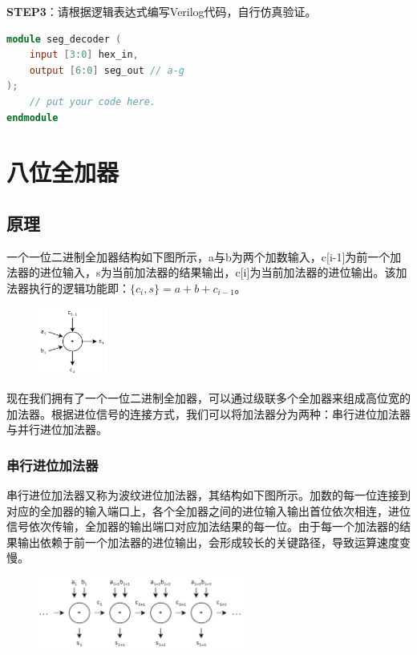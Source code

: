 \documentclass{ctexart}
\begin{document}
\textbf{STEP3}：请根据逻辑表达式编写Verilog代码，自行仿真验证。
\begin{lstlisting}[language=Verilog]
module seg_decoder (
    input [3:0] hex_in,
    output [6:0] seg_out // a-g
);
    // put your code here.
endmodule
\end{lstlisting}


\section{八位全加器}

\subsection{原理}

一个一位二进制全加器结构如下图所示，a与b为两个加数输入，c[i-1]为前一个加法器的进位输入，s为当前加法器的结果输出，c[i]为当前加法器的进位输出。该加法器执行的逻辑功能即：$\{c_i,s\}=a+b+c_{i-1}$。

\begin{figure}[H]
    \centering
    \includegraphics[width=0.2\textwidth]{lab1/3.jpg}
\end{figure}

现在我们拥有了一个一位二进制全加器，可以通过级联多个全加器来组成高位宽的加法器。根据进位信号的连接方式，我们可以将加法器分为两种：串行进位加法器与并行进位加法器。

\subsubsection*{串行进位加法器}

串行进位加法器又称为波纹进位加法器，其结构如下图所示。加数的每一位连接到对应的全加器的输入端口上，各个全加器之间的进位输入输出首位依次相连，进位信号依次传输，全加器的输出端口对应加法结果的每一位。由于每一个加法器的结果输出依赖于前一个加法器的进位输出，会形成较长的关键路径，导致运算速度变慢。

\begin{figure}[H]
    \centering
    \includegraphics[width=0.6\textwidth]{lab1/4.jpg}
\end{figure}
\end{document}

